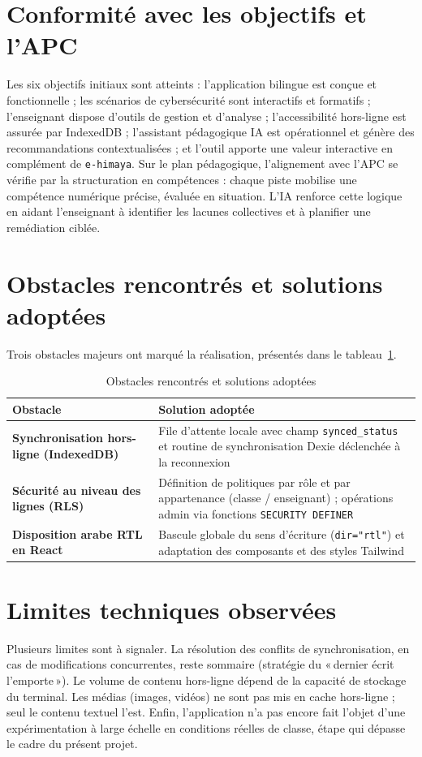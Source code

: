 \documentclass[12pt, a4paper, oneside]{report}
\begin{document}
\section{Conformité avec les objectifs et l'APC}
Les six objectifs initiaux sont atteints : l'application bilingue est conçue et fonctionnelle ; les scénarios de cybersécurité sont interactifs et formatifs ; l'enseignant dispose d'outils de gestion et d'analyse ; l'accessibilité hors-ligne est assurée par IndexedDB ; l'assistant pédagogique IA est opérationnel et génère des recommandations contextualisées ; et l'outil apporte une valeur interactive en complément de \texttt{e-himaya}. Sur le plan pédagogique, l'alignement avec l'APC se vérifie par la structuration en compétences : chaque piste mobilise une compétence numérique précise, évaluée en situation. L'IA renforce cette logique en aidant l'enseignant à identifier les lacunes collectives et à planifier une remédiation ciblée.

\section{Obstacles rencontrés et solutions adoptées}
Trois obstacles majeurs ont marqué la réalisation, présentés dans le tableau~\ref{tab:obstacles}.

\begin{table}[H]
\centering
\caption{Obstacles rencontrés et solutions adoptées}
\label{tab:obstacles}
\begin{tabularx}{\textwidth}{@{}>{\bfseries}p{} X@{}}
\toprule
Obstacle & Solution adoptée \\
\midrule
Synchronisation hors-ligne (IndexedDB) & File d'attente locale avec champ \texttt{synced\_status} et routine de synchronisation Dexie déclenchée à la reconnexion \\
Sécurité au niveau des lignes (RLS) & Définition de politiques par rôle et par appartenance (classe / enseignant) ; opérations admin via fonctions \texttt{SECURITY DEFINER} \\
Disposition arabe RTL en React & Bascule globale du sens d'écriture (\texttt{dir="rtl"}) et adaptation des composants et des styles Tailwind \\
\bottomrule
\end{tabularx}
\end{table}

\section{Limites techniques observées}
Plusieurs limites sont à signaler. La résolution des conflits de synchronisation, en cas de modifications concurrentes, reste sommaire (stratégie du «\,dernier écrit l'emporte\,»). Le volume de contenu hors-ligne dépend de la capacité de stockage du terminal. Les médias (images, vidéos) ne sont pas mis en cache hors-ligne ; seul le contenu textuel l'est. Enfin, l'application n'a pas encore fait l'objet d'une expérimentation à large échelle en conditions réelles de classe, étape qui dépasse le cadre du présent projet.
\end{document}
